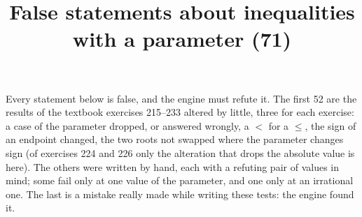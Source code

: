 \documentclass[11pt,a4paper]{article}
\title{False statements about inequalities with a parameter (71)}
\author{}
\date{}
\begin{document}
\maketitle
Every statement below is false, and the engine must refute it. The first 52 are the results of the textbook exercises 215--233 altered by little, three for each exercise: a case of the parameter dropped, or answered wrongly, a $<$ for a $\le$, the sign of an endpoint changed, the two roots not swapped where the parameter changes sign (of exercises 224 and 226 only the alteration that drops the absolute value is here). The others were written by hand, each with a refuting pair of values in mind; some fail only at one value of the parameter, and one only at an irrational one. The last is a mistake really made while writing these tests: the engine found it.
\end{document}

